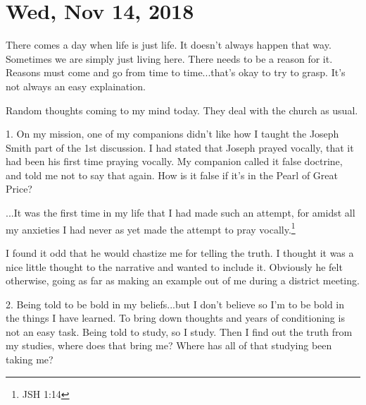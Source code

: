 \section{Wed, Nov 14, 2018}

There comes a day when life is just life. It doesn't always happen that way.
Sometimes we are simply just living here. There needs to be a reason for it. Reasons
must come and go from time to time...that's okay to try to grasp. It's not always an
easy explaination.

Random thoughts coming to my mind today. They deal with the church as usual.

1. On my mission, one of my companions didn't like how I taught the Joseph Smith part
of the 1st discussion. I had stated that Joseph prayed vocally, that it had been his
first time praying vocally. My companion called it false doctrine, and told me not to
say that again. How is it false if it's in the Pearl of Great Price?

\begin{displayquote}
...It was the first time in my life that I had made such an attempt, for amidst all 
my anxieties I had never as yet made the attempt to pray vocally.\footnote{JSH 1:14}
\end{displayquote}

I found it odd that he would chastize me for telling the truth. I thought it was a
nice little thought to the narrative and wanted to include it. Obviously he felt
otherwise, going as far as making an example out of me during a district meeting.

2. Being told to be bold in my beliefs...but I don't believe so I'm to be bold in the
things I have learned. To bring down thoughts and years of conditioning is not an
easy task. Being told to study, so I study. Then I find out the truth from my
studies, where does that bring me? Where has all of that studying been taking me?